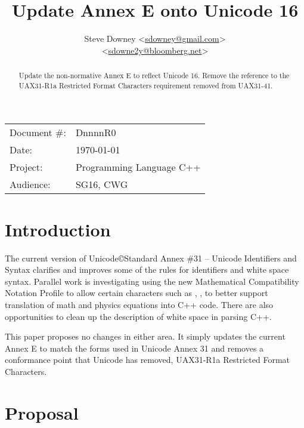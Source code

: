 \documentclass[a4paper,10pt,oneside,openany,final,article]{memoir}
\begin{document}
\title{Update Annex E onto Unicode 16}
\author{
  Steve Downey \small<\href{mailto:sdowney@gmail.com}{sdowney@gmail.com}> \\
  \small<\href{mailto:sdowne2y@bloomberg.net}{sdowne2y@bloomberg.net}> \\
}
\date{} %
\maketitle

\begin{flushright}
  \begin{tabular}{ll}
    Document \#: & DnnnnR0 \\
    Date: & \today \\
    Project: & Programming Language C++ \\
    Audience: & SG16, CWG
  \end{tabular}
\end{flushright}

\begin{abstract}
  Update the non-normative Annex E to reflect Unicode 16.
  Remove the reference to the UAX31-R1a Restricted Format Characters requirement removed from UAX31-41.
\end{abstract}

\tableofcontents*


\chapter{Introduction}
The current version of Unicode\copyright Standard Annex \#31 -- Unicode Identifiers and Syntax clarifies and improves some of the rules for identifiers and white space syntax. Parallel work is investigating using the new Mathematical Compatibility Notation Profile to allow certain characters such as \partial, \nabla, to better support translation of math and physics equations into C++ code. There are also opportunities to clean up the description of white space in parsing C++.

This paper proposes no changes in either area. It simply updates the current Annex E to match the forms used in Unicode Annex 31 and removes a conformance point that Unicode has removed, UAX31-R1a Restricted Format Characters.

\chapter{Proposal}
\end{document}
